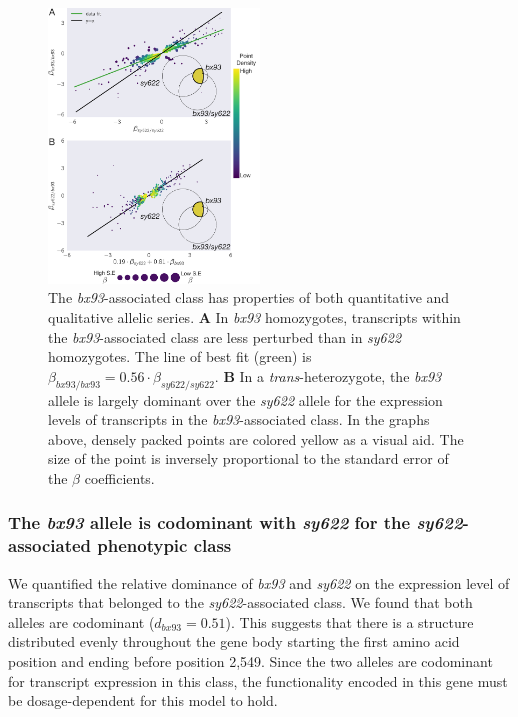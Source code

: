 \documentclass[10pt, twocolumn]{article}
\begin{document}
\begin{figure}
  \centering{}
  \includegraphics[width=0.5\textwidth]{../figs/bx93_associated_analysis.pdf}
  \caption{The \emph{bx93}-associated class has properties of both quantitative
    and qualitative allelic series.
    \textbf{A} In \emph{bx93}
    homozygotes, transcripts within the \emph{bx93}-associated class are
    less perturbed than in \emph{sy622}
    homozygotes. The line of best fit (green) is
    $\beta_{bx93/bx93}=0.56\cdot\beta_{sy622/sy622}$.
    \textbf{B} In a \emph{trans}-heterozygote, the \emph{bx93} allele is largely
    dominant over the \emph{sy622} allele for the expression levels of
    transcripts in the \emph{bx93}-associated class.
    In the graphs above, densely packed points are colored yellow as a visual
    aid. The size of the point is inversely proportional to the standard error
    of the $\beta$ coefficients.
    }
\label{fig:bx93_associated}
\end{figure}

\subsubsection*{The \emph{bx93} allele is codominant with \emph{sy622} for the
                \emph{sy622}-associated phenotypic class}
We quantified the relative dominance of \emph{bx93} and \emph{sy622} on the
expression level of transcripts that belonged to the \emph{sy622}-associated
class. We found that both alleles are codominant ($d_{bx93} = 0.51$). This
suggests that there is a structure distributed evenly throughout the gene
body starting the first amino acid position and ending before position 2,549.
Since the two alleles are codominant for transcript expression in this class,
the functionality encoded in this gene must be dosage-dependent for this model
to hold.
\end{document}
